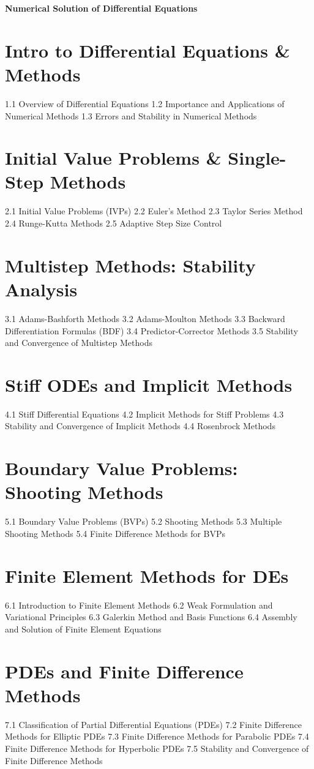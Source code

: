 {\LARGE \bf{Numerical Solution of Differential Equations}}
\section{Intro to Differential Equations \& Methods}
1.1 Overview of Differential Equations
1.2 Importance and Applications of Numerical Methods
1.3 Errors and Stability in Numerical Methods
\section{Initial Value Problems \& Single-Step Methods}
2.1 Initial Value Problems (IVPs)
2.2 Euler's Method
2.3 Taylor Series Method
2.4 Runge-Kutta Methods
2.5 Adaptive Step Size Control
\section{Multistep Methods: Stability Analysis}
3.1 Adams-Bashforth Methods
3.2 Adams-Moulton Methods
3.3 Backward Differentiation Formulas (BDF)
3.4 Predictor-Corrector Methods
3.5 Stability and Convergence of Multistep Methods
\section{Stiff ODEs and Implicit Methods}
4.1 Stiff Differential Equations
4.2 Implicit Methods for Stiff Problems
4.3 Stability and Convergence of Implicit Methods
4.4 Rosenbrock Methods
\section{Boundary Value Problems: Shooting Methods}
5.1 Boundary Value Problems (BVPs)
5.2 Shooting Methods
5.3 Multiple Shooting Methods
5.4 Finite Difference Methods for BVPs
\section{Finite Element Methods for DEs}
6.1 Introduction to Finite Element Methods
6.2 Weak Formulation and Variational Principles
6.3 Galerkin Method and Basis Functions
6.4 Assembly and Solution of Finite Element Equations
\section{PDEs and Finite Difference Methods}
7.1 Classification of Partial Differential Equations (PDEs)
7.2 Finite Difference Methods for Elliptic PDEs
7.3 Finite Difference Methods for Parabolic PDEs
7.4 Finite Difference Methods for Hyperbolic PDEs
7.5 Stability and Convergence of Finite Difference Methods
